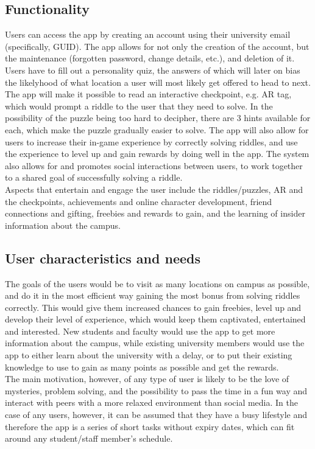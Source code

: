 \documentclass[a4,10pt,twocolumn]{article}
\begin{document}
\subsection*{Functionality}
Users can access the app by creating an account using their university email (specifically, GUID). The app allows for not only the creation of the account, but the maintenance (forgotten password, change details, etc.), and deletion of it. Users have to fill out a personality quiz, the answers of which will later on bias the likelyhood of what location a user will most likely get offered to head to next. The app will make it possible to read an interactive checkpoint, e.g. AR tag, which would prompt a riddle to the user that they need to solve. In the possibility of the puzzle being too hard to decipher, there are 3 hints available for each, which make the puzzle gradually easier to solve. The app will also allow for users to increase their in-game experience by correctly solving riddles, and use the experience to level up and gain rewards by doing well in the app. The system also allows for and promotes social interactions between users, to work together to a shared goal of successfully solving a riddle.\\
Aspects that entertain and engage the user include the riddles/puzzles, AR and the checkpoints, achievements and online character development, friend connections and gifting, freebies and rewards to gain, and the learning of insider information about the campus.

\subsection*{User characteristics and needs}
The goals of the users would be to visit as many locations on campus as possible, and do it in the most efficient way gaining the most bonus from solving riddles correctly. This would give them increased chances to gain freebies, level up and develop their level of experience, which would keep them captivated, entertained and interested. New students and faculty would use the app to get more information about the campus, while existing university members would use the app to either learn about the university with a delay, or to put their existing knowledge to use to gain as many points as possible and get the rewards.\\
The main motivation, however, of any type of user is likely to be the love of mysteries, problem solving, and the possibility to pass the time in a fun way and interact with peers with a more relaxed environment than social media. In the case of any users, however, it can be assumed that they have a busy lifestyle and therefore the app is a series of short tasks without expiry dates, which can fit around any student/staff member's schedule.
\end{document}
